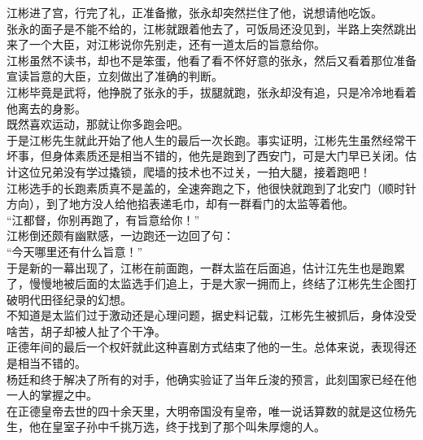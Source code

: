 \begin{multicols}{\theparacolNo}
江彬进了宫，行完了礼，正准备撤，张永却突然拦住了他，说想请他吃饭。\\

张永的面子是不能不给的，江彬就跟着他去了，可饭局还没见到，半路上突然跳出来了一个大臣，对江彬说你先别走，还有一道太后的旨意给你。\\

江彬虽然不读书，却也不是笨蛋，他看了看不怀好意的张永，然后又看着那位准备宣读旨意的大臣，立刻做出了准确的判断。\\

江彬毕竟是武将，他挣脱了张永的手，拔腿就跑，张永却没有追，只是冷冷地看着他离去的身影。\\

既然喜欢运动，那就让你多跑会吧。\\

于是江彬先生就此开始了他人生的最后一次长跑。事实证明，江彬先生虽然经常干坏事，但身体素质还是相当不错的，他先是跑到了西安门，可是大门早已关闭。估计这位兄弟没有学过撬锁，爬墙的技术也不过关，一拍大腿，接着跑吧！\\

江彬选手的长跑素质真不是盖的，全速奔跑之下，他很快就跑到了北安门（顺时针方向），到了地方没人给他掐表递毛巾，却有一群看门的太监等着他。\\

“江都督，你别再跑了，有旨意给你！”\\

江彬倒还颇有幽默感，一边跑还一边回了句：\\

“今天哪里还有什么旨意！”\\

于是新的一幕出现了，江彬在前面跑，一群太监在后面追，估计江先生也是跑累了，慢慢地被后面的太监选手们追上，于是大家一拥而上，终结了江彬先生企图打破明代田径纪录的幻想。\\

不知道是太监们过于激动还是心理问题，据史料记载，江彬先生被抓后，身体没受啥苦，胡子却被人扯了个干净。\\

正德年间的最后一个权奸就此这种喜剧方式结束了他的一生。总体来说，表现得还是相当不错的。\\

杨廷和终于解决了所有的对手，他确实验证了当年丘浚的预言，此刻国家已经在他一人的掌握之中。\\

在正德皇帝去世的四十余天里，大明帝国没有皇帝，唯一说话算数的就是这位杨先生，他在皇室子孙中千挑万选，终于找到了那个叫朱厚熜的人。\\


\end{multicols}
